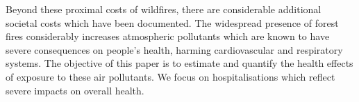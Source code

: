 \documentclass[11pt]{article}
\begin{document}
\begin{spacing}{1.5}
Beyond these proximal costs of wildfires, there are considerable additional societal costs which have been documented.  The widespread presence of forest fires considerably increases atmospheric pollutants which are known to have severe consequences on people's health, harming cardiovascular and respiratory systems. The objective of this paper is to estimate and quantify the health effects of exposure to these air pollutants. We focus on hospitalisations which reflect severe impacts on overall health. 





\end{spacing}
\end{document}
